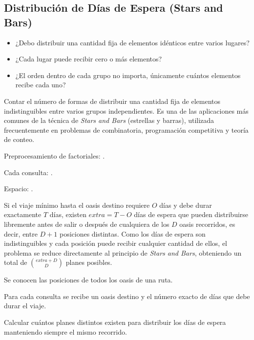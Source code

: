 \subsection{Distribución de Días de Espera (Stars and Bars)}


\begin{itemize}
\item ¿Debo distribuir una cantidad fija de elementos idénticos entre varios lugares?
\item ¿Cada lugar puede recibir cero o más elementos?
\item ¿El orden dentro de cada grupo no importa, únicamente cuántos elementos recibe cada uno?
\end{itemize}


Contar el número de formas de distribuir una cantidad fija de elementos indistinguibles entre varios grupos independientes. Es una de las aplicaciones más comunes de la técnica de \textit{Stars and Bars} (estrellas y barras), utilizada frecuentemente en problemas de combinatoria, programación competitiva y teoría de conteo.


Preprocesamiento de factoriales: .

Cada consulta: .

Espacio: .

 Si el viaje mínimo hasta el oasis destino requiere $O$ días y debe durar exactamente $T$ días, existen $extra=T-O$ días de espera que pueden distribuirse libremente antes de salir o después de cualquiera de los $D$ oasis recorridos, es decir, entre $D+1$ posiciones distintas. Como los días de espera son indistinguibles y cada posición puede recibir cualquier cantidad de ellos, el problema se reduce directamente al principio de \textit{Stars and Bars}, obteniendo un total de $\binom{extra+D}{D}$ planes posibles.


Se conocen las posiciones de todos los oasis de una ruta.

Para cada consulta se recibe un oasis destino y el número exacto de días que debe durar el viaje.

Calcular cuántos planes distintos existen para distribuir los días de espera manteniendo siempre el mismo recorrido.

